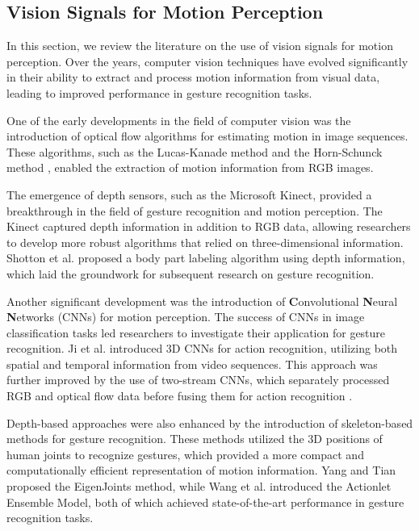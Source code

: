 \documentclass[12pt, a4paper]{article}
\begin{document}
\subsection{Vision Signals for Motion Perception}
In this section, we review the literature on the use of vision signals for motion perception. Over the years, computer vision techniques have evolved significantly in their ability to extract and process motion information from visual data, leading to improved performance in gesture recognition tasks.

One of the early developments in the field of computer vision was the introduction of optical flow algorithms for estimating motion in image sequences. These algorithms, such as the Lucas-Kanade method \cite{lucas1981iterative} and the Horn-Schunck method \cite{horn1981determining}, enabled the extraction of motion information from RGB images.

The emergence of depth sensors, such as the Microsoft Kinect, provided a breakthrough in the field of gesture recognition and motion perception. The Kinect captured depth information in addition to RGB data, allowing researchers to develop more robust algorithms that relied on three-dimensional information. Shotton et al. \cite{shotton2011real} proposed a body part labeling algorithm using depth information, which laid the groundwork for subsequent research on gesture recognition.

Another significant development was the introduction of \textbf{C}onvolutional \textbf{N}eural \textbf{N}etworks (CNNs) for motion perception. The success of CNNs in image classification tasks \cite{krizhevsky2017imagenet} led researchers to investigate their application for gesture recognition. Ji et al. \cite{ji20123d} introduced 3D CNNs for action recognition, utilizing both spatial and temporal information from video sequences. This approach was further improved by the use of two-stream CNNs, which separately processed RGB and optical flow data before fusing them for action recognition \cite{simonyan2014two}.

Depth-based approaches were also enhanced by the introduction of skeleton-based methods for gesture recognition. These methods utilized the 3D positions of human joints to recognize gestures, which provided a more compact and computationally efficient representation of motion information. Yang and Tian \cite{yang2012eigenjoints} proposed the EigenJoints method, while Wang et al. \cite{wang2012mining} introduced the Actionlet Ensemble Model, both of which achieved state-of-the-art performance in gesture recognition tasks.
\end{document}
